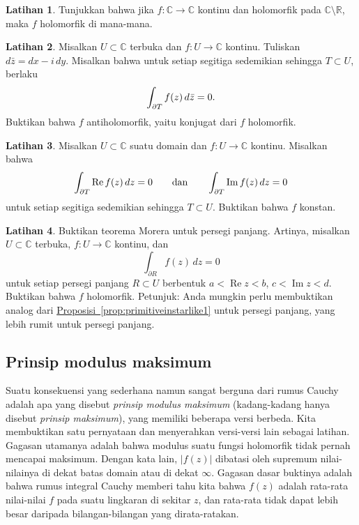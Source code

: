 \documentclass[12pt,openany]{book}
\newcommand{\avoidbreak}{\postdisplaypenalty=100}
\renewcommand{\Re}{\operatorname{Re}}
\renewcommand{\Im}{\operatorname{Im}}
\newcommand{\sabs}[1]{\lvert {#1} \rvert}
\newcommand{\C}{{\mathbb{C}}}
\newcommand{\R}{{\mathbb{R}}}
\theoremstyle{plain}
\theoremstyle{remark}
\theoremstyle{definition}
\newenvironment{exbox}{%
    \def\FrameCommand{\vrule width 1pt \relax\hspace{10pt}}%
    \MakeFramed{\advance\hsize-\width\FrameRestore}%
}{%
    \endMakeFramed
}
\theoremstyle{exercise}
\newtheorem{exercise}{Latihan}[section]
\theoremstyle{example}
\newcommand{\propref}[1]{\hyperref[#1]{Proposisi~\ref*{#1}}}
\begin{document}
\begin{exbox}
\begin{exercise}
Tunjukkan bahwa jika $f \colon \C \to \C$ kontinu dan holomorfik pada $\C
\setminus \R$, maka $f$ holomorfik di mana-mana.
\end{exercise}

\begin{exercise}
Misalkan $U \subset \C$ terbuka dan $f \colon U \to \C$ kontinu.
Tuliskan $d\bar{z} = dx - i \, dy$.
Misalkan bahwa 
untuk setiap segitiga sedemikian sehingga $T \subset U$, berlaku
\begin{equation*}
\int_{\partial T} f(z) \, d\bar{z} = 0 .
\avoidbreak
\end{equation*}
Buktikan bahwa $f$
antiholomorfik, yaitu konjugat dari $f$ holomorfik.
\end{exercise}

\begin{exercise}
Misalkan $U \subset \C$ suatu domain dan $f \colon U \to \C$ kontinu.
Misalkan bahwa
\begin{equation*}
\int_{\partial T} \Re f(z) \, dz = 0
\qquad \text{dan} \qquad
\int_{\partial T} \Im f(z) \, dz = 0
\avoidbreak
\end{equation*}
untuk setiap segitiga sedemikian sehingga $T \subset U$.  Buktikan bahwa $f$ konstan.
\end{exercise}

\begin{exercise}
Buktikan teorema Morera untuk persegi panjang.  Artinya, misalkan $U \subset \C$ terbuka,
$f \colon U \to \C$ kontinu,
dan
\begin{equation*}
\int_{\partial R} f(z) \, dz = 0
\end{equation*}
untuk setiap persegi panjang $R \subset U$ berbentuk
$a < \Re z < b$, $c < \Im z < d$.  Buktikan bahwa $f$ holomorfik.
Petunjuk: Anda mungkin perlu membuktikan analog dari
\propref{prop:primitiveinstarlike1} untuk persegi panjang, yang lebih rumit untuk
persegi panjang.
\end{exercise}
\end{exbox}

\subsection{Prinsip modulus maksimum}

Suatu konsekuensi yang sederhana namun sangat berguna dari rumus Cauchy adalah apa yang disebut
\emph{prinsip modulus maksimum}
(kadang-kadang hanya disebut \emph{prinsip maksimum}),
yang memiliki beberapa versi berbeda.
Kita membuktikan satu pernyataan dan menyerahkan versi-versi lain sebagai latihan.
Gagasan utamanya adalah bahwa modulus suatu fungsi holomorfik tidak pernah
mencapai maksimum.  Dengan kata lain, $\sabs{f(z)}$ dibatasi
oleh supremum nilai-nilainya di dekat batas domain atau di dekat
$\infty$.
Gagasan dasar buktinya adalah bahwa rumus integral Cauchy memberi tahu kita bahwa
$f(z)$ adalah rata-rata nilai-nilai $f$ pada suatu lingkaran di sekitar $z$, dan
rata-rata tidak dapat lebih besar daripada bilangan-bilangan yang dirata-ratakan.
\end{document}
